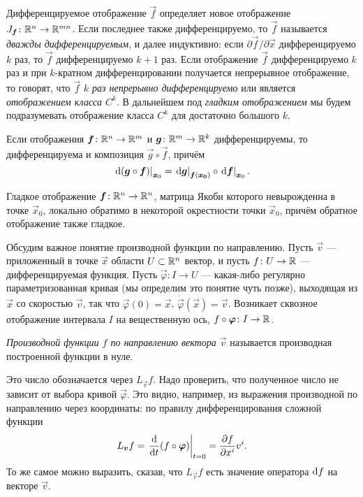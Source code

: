Дифференцируемое отображение $\vec{f}$ определяет новое отображение $J_{\boldsymbol{f}}\colon \mathbb{R}^n \to \mathbb{R}^{mn}$. Если последнее также дифференцируемо, то $\vec{f}$ называется \textit{дважды дифференцируемым}, и далее индуктивно: если $\partial\vec{f} / \partial\vec{x}$ дифференцируемо $k$ раз, то $\vec{f}$ дифференцируемо $k + 1$ раз. Если отображение $\vec{f}$ дифференцируемо $k$ раз и при $k$-кратном дифференцировании получается непрерывное отображение, то говорят, что $\vec{f}$ \textit{$k$ раз непрерывно дифференцируемо} или является \textit{отображением класса $C^k$}. В дальнейшем под \textit{гладким отображением} мы будем подразумевать отображение класса $C^k$ для достаточно большого $k$.

\begin{theorem}
	Если отображения $\boldsymbol{f}\colon \mathbb{R}^n \to \mathbb{R}^m$ и $\boldsymbol{g}\colon \mathbb{R}^m \to \mathbb{R}^k$ дифференцируемы, то дифференцируема и композиция $\vec{g} \circ \vec{f}$, причём
	\[
		\left.\mathop{}\!\mathrm{d}(\boldsymbol{g} \circ \boldsymbol{f})\right|_{\boldsymbol{x}_0} = \left.\mathop{}\!\mathrm{d}\boldsymbol{g}\right|_{\boldsymbol{f}(\boldsymbol{x_0})} \circ \left.\mathop{}\!\mathrm{d}\boldsymbol{f}\right|_{\boldsymbol{x}_0}.
	\]
\end{theorem}

\begin{theorem}
	Гладкое отображение $\boldsymbol{f}\colon \mathbb{R}^n \to \mathbb{R}^n$, матрица Якоби которого невырожденна в точке $\vec{x}_0$, локально обратимо в некоторой окрестности точки $\vec{x}_0$, причём обратное отображение также гладкое.
\end{theorem}

Обсудим важное понятие производной функции по направлению. Пусть $\vec{v}$ --- приложенный в точке $\vec{x}$ области $U \subset \mathbb{R}^n$ вектор, и пусть $f\colon U \to \mathbb{R}$ --- дифференцируемая функция. Пусть $\vec{\varphi}\colon I \to U$ --- какая-либо регулярно параметризованная кривая (мы определим это понятие чуть позже), выходящая из $\vec{x}$ со скоростью $\vec{v}$, так что $\vec{\varphi}(0) = \vec{x}$, $\dot{\vec{\varphi}}(\vec{x}) = \vec{v}$. Возникает сквозное отображение интервала $I$ на вещественную ось, $f \circ \boldsymbol{\varphi}\colon I \to \mathbb{R}$.

\begin{definition}
	\textit{Производной функции $f$ по направлению вектора $\vec{v}$} называется производная построенной функции в нуле.
\end{definition}

Это число обозначается через $L_{\vec{v}}f$. Надо проверить, что полученное число не зависит от выбора кривой $\vec{\varphi}$. Это видно, например, из выражения производной по направлению через координаты: по правилу дифференцирования сложной функции
\[
	L_{\boldsymbol{v}}f = \left.\frac{\mathop{}\!\mathrm{d}}{\mathop{}\!\mathrm{d} t}(f \circ \boldsymbol{\varphi})\right|_{t = 0} = \frac{\partial f}{\partial x^i}v^i.
\]
То же самое можно выразить, сказав, что $L_{\vec{v}}f$ есть значение оператора $\mathop{}\!\mathrm{d} f$ на векторе $\vec{v}$.

